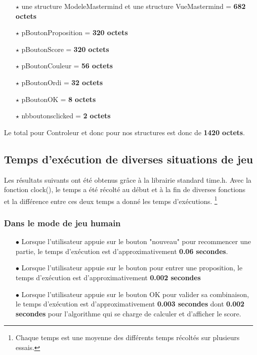 \documentclass[a4paper, 11pt, oneside]{article}
\begin{document}
\begin{itemize}
    \begin{itemize}
        \item[$\star$] une structure ModeleMastermind et une structure VueMastermind = \textbf{682 octets}
        \item[$\star$] pBoutonProposition = \textbf{320 octets}
        \item[$\star$] pBoutonScore = \textbf{320 octets}
        \item[$\star$] pBoutonCouleur = \textbf{56 octets}
        \item[$\star$] pBoutonOrdi = \textbf{32 octets}
        \item[$\star$] pBoutonOK = \textbf{8 octets}
        \item[$\star$] nb\textunderscore boutons\textunderscore clicked = \textbf{2 octets}
    \end{itemize}
\end{itemize}
    Le total pour Controleur et donc pour nos structures est donc de \textbf{1420 octets}.
\subsection{Temps d'exécution de diverses situations de jeu}
Les résultats suivants ont été obtenus grâce à la librairie standard time.h.
Avec la fonction clock(), le temps a été récolté au début et à la fin de diverses fonctions et la différence entre ces deux temps a donné les temps d'exécutions. \footnote{Chaque temps est une moyenne des différents temps récoltés sur plusieurs essais.}
\subsubsection{Dans le mode de jeu humain}
\begin{itemize} 
    \item[$\bullet$] Lorsque l'utilisateur appuie sur le bouton "nouveau" pour recommencer une partie, le temps d'exécution est d'approximativement \textbf{0.06 secondes}.
    \item[$\bullet$] Lorsque l'utilisateur appuie sur le bouton pour entrer une proposition, le temps d'exécution est d'approximativement \textbf{0.002 secondes}
    \item[$\bullet$] Lorsque l'utilisateur appuie sur le bouton OK pour valider sa combinaison, le temps d'exécution est d'approximativement \textbf{0.003 secondes} dont \textbf{0.002 secondes} pour l'algorithme qui se charge de calculer et d'afficher le score.
\end{itemize}
\end{document}
